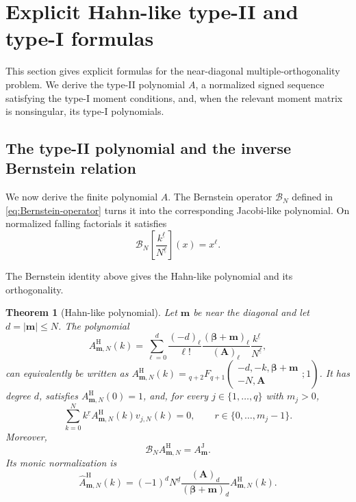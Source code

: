 \documentclass[10pt]{amsart}
\newcommand{\A}{\boldsymbol A}
\newcommand{\bbeta}{\boldsymbol\beta}
\newcommand{\mm}{\boldsymbol m}
\newcommand{\abs}[1]{\lvert#1\rvert}
\newcommand{\fall}[2]{#1^{\underline{#2}}}
\newcommand{\pFq}[5]{{}_{#1}F_{#2}\!\left(\begin{matrix}#3\\#4\end{matrix};#5\right)}
\theoremstyle{plain}
\newtheorem{theorem}{Theorem}[section]
\theoremstyle{definition}
\theoremstyle{remark}
\begin{document}
\section{Explicit Hahn-like type-II and type-I formulas}
\label{sec:Hahn-forms}

This section gives explicit formulas for the near-diagonal
multiple-orthogonality problem. We derive the type-II polynomial \(A\), a
normalized signed sequence satisfying the type-I moment conditions, and,
when the relevant moment matrix is nonsingular, its type-I polynomials.

\subsection{The type-II polynomial and the inverse Bernstein relation}

We now derive the finite polynomial \(A\). The Bernstein operator
\(\mathscr B_N\) defined in \eqref{eq:Bernstein-operator} turns it into the
corresponding Jacobi-like polynomial.  On normalized falling factorials it
satisfies
\begin{equation}
 \mathscr B_N\!\left[\frac{\fall{k}{\ell}}{\fall{N}{\ell}}\right](x)
 =x^\ell.
 \label{eq:Bernstein-factorial-basis}
\end{equation}

The Bernstein identity above gives the Hahn-like polynomial and its
orthogonality.

\begin{theorem}[Hahn-like polynomial]
\label{thm:Hahn-A}
Let \(\mm\) be near the diagonal and let \(d=\abs\mm\le N\). The polynomial
\begin{equation}
 A^{\mathrm H}_{\mm,N}(k)=
 \sum_{\ell=0}^d
 \frac{(-d)_\ell}{\ell!}
 \frac{(\bbeta+\mm)_\ell}{(\A)_\ell}
 \frac{\fall{k}{\ell}}{\fall{N}{\ell}},
 \label{eq:Hahn-A-factorial}
\end{equation}
can equivalently be written as
\(A^{\mathrm H}_{\mm,N}(k)=
\pFq{q+2}{q+1}{-d,-k,\bbeta+\mm}{-N,\A}{1}\).
It has degree \(d\), satisfies \(A^{\mathrm H}_{\mm,N}(0)=1\), and, for
every \(j\in\{1,\ldots,q\}\) with \(m_j>0\),
\begin{equation}
 \sum_{k=0}^N\fall{k}{r}
 A^{\mathrm H}_{\mm,N}(k)v_{j,N}(k)=0,
 \qquad r\in\{0,\ldots,m_j-1\}.
 \label{eq:Hahn-A-orthogonality}
\end{equation}
Moreover,
\begin{equation}
 \mathscr B_NA^{\mathrm H}_{\mm,N}=A^{\mathrm J}_{\mm}.
 \label{eq:inverse-Bernstein-identity}
\end{equation}
Its monic normalization is
\begin{equation}
 \widehat A^{\mathrm H}_{\mm,N}(k)
 =(-1)^d\fall{N}{d}
 \frac{(\A)_d}{(\bbeta+\mm)_d}
 A^{\mathrm H}_{\mm,N}(k).
 \label{eq:Hahn-monic-A}
\end{equation}
\end{theorem}
\end{document}
